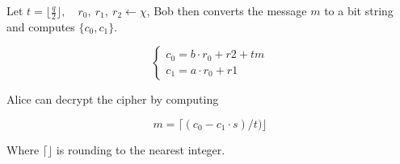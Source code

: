\begin{definition}
    Let $t = \lfloor \frac{q}{2} \rfloor, \quad r_0,\ r_1,\ r_2
    \leftarrow \chi$, Bob then converts the message $m$ to a bit string and
    computes $\{c_0, c_1\}$.

    \[
        \begin{cases}
            c_0 = b \cdot r_0 + r2 + tm\\
            c_1 = a \cdot r_0 + r1
        \end{cases}
    \]

\end{definition}

\begin{definition}
    Alice can decrypt the cipher by computing

    \[m = \lceil (c_0 - c_1 \cdot s) / t) \rfloor \]

    Where $\lceil \rfloor$ is rounding to the nearest integer.
\end{definition}

